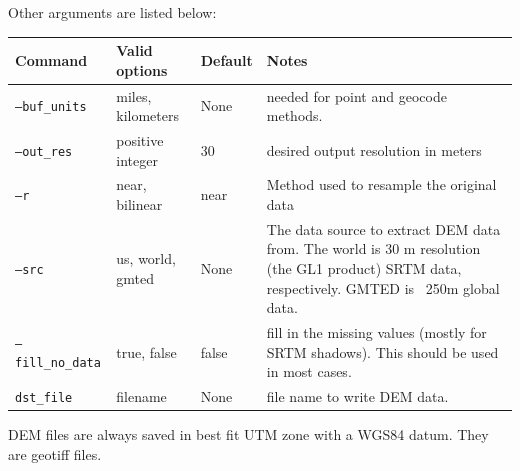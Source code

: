 \documentclass[12pt,oneside,final]{article}
\begin{document}
\noindent
Other arguments are listed below:
\medskip
\noindent
\begin{center}
\begin{tabular}{| l | l | l | p{2.75in} |}
    \hline
    Command & Valid options & Default & Notes \\ \hline
    \texttt{--buf\_units} & miles, kilometers & None & needed for point 
                                                       and geocode methods.
                                                       \\ \hline
    \texttt{--out\_res} & positive integer & 30 & desired output resolution in
                                                  meters \\ \hline
    \texttt{--r} & near, bilinear & near & Method used to resample the original
                                           data \\ \hline
    \texttt{--src} & us, world, gmted & None & The data source to extract DEM
                                               data from.  The world is 30 m resolution (the GL1 product)
                                               SRTM data,
                                               respectively. GMTED is ~250m
                                               global data.
                                               \\ \hline
    \texttt{--fill\_no\_data} & true, false & false & fill in the missing values
                                                   (mostly for SRTM shadows).
                                                   This should be used in most
                                                   cases. \\ \hline
    \texttt{dst\_file} & filename & None & file name to write DEM data. \\
                                           \hline
\end{tabular}
\end{center}
DEM files are always saved in best fit UTM zone with a WGS84 datum.  They are geotiff files.
\end{document}
